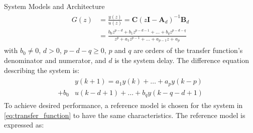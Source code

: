 \begin{section}{System Models and Architecture}
	\begin{align}
	\begin{split}
	\label{eq:transfer_function}
        G(z) & = \frac{y(z)}{u(z)} = \bm{C}(z\bm{I}-\bm{A}_d)^{-1}\bm{B}_d  \\
	& = \frac{b_0z^{p-d}+b_1z^{p-d-1} +...+b_qz^{p-d-q}}{z^{p}+a_1z^{p-1}+...+a_{p-1}z+a_p} 
	\end{split}
	\end{align}
with $b_0\ne{0}$, $d>0$, $p-d-q\geq{0}$, $p$ and $q$ are orders of the transfer function's denominator and numerator, and $d$ is the system delay. The difference equation describing the system is:
    \begin{align}
    \begin{split}
	\label{eq:difference_equation}
	&y(k+1)=a_1y(k)+\dots+a_py(k-p) \\
	+b_0&u(k-d+1)+\dots+b_qy(k-q-d+1)
	\end{split}
	\end{align}
To achieve desired performance, a reference model is chosen for the system in \eqref{eq:transfer_function} to have the same characteristics. The reference model is expressed as:


	




\end{section}
